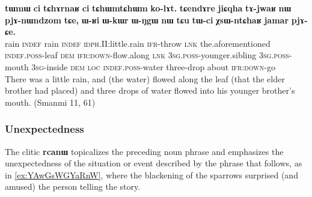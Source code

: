 \documentclass[oldfontcommands,oneside,a4paper,11pt]{article}
\newcommand{\ipa}[1]{\mbox{\phon\textbf{#1}}} %
\begin{document}
\begin{exe}
\ex \label{ex:jiCqha}
 \gll \ipa{tɯmɯ} 	\ipa{ci} 	\ipa{tɕhɤrnaʁ} 	\ipa{ci} 	\ipa{tɕhɯmtɕhɯm} 	\ipa{ko-lɤt.} 	\ipa{tɕendɤre} 	\ipa{jiɕqha} 	\ipa{tɤ-jwaʁ} 	\ipa{nɯ} 	\ipa{pjɤ-nɯndzom} 	\ipa{tɕe,} 	\ipa{ɯ-ʁi} 	\ipa{ɯ-kɯr} 	\ipa{ɯ-ŋgɯ} 	\ipa{nɯ} 	\ipa{tɕu} 	\ipa{tɯ-ci} 	\ipa{χsɯ-ntɕhaʁ} 	\ipa{jamar} 	\ipa{pjɤ-ɕe.} \\
 rain \textsc{indef}  rain \textsc{indef} \textsc{idph}.II:little.rain \textsc{ifr}-throw \textsc{lnk} the.aforementioned \textsc{indef.poss}-leaf \textsc{dem} \textsc{ifr:down}-flow.along \textsc{lnk} \textsc{3sg.poss}-younger.sibling  \textsc{3sg.poss}-mouth \textsc{3sg}-inside \textsc{dem} \textsc{loc} \textsc{indef.poss}-water three-drop about \textsc{ifr:down}-go \\
 \glt There was a little rain, and (the water) flowed along the leaf (that the elder brother had placed) and three drops of water flowed into his younger brother's mouth. (Smanmi 11, 61)
\end{exe}

 \subsubsection{Unexpectedness}
The clitic \ipa{rcanɯ} topicalizes the preceding noun phrase and emphasizes the unexpectedness of the situation or event described by the phrase that follows, as in \ref{ex:YAwGsWGYaRnW}, where the blackening of the sparrows surprised (and amused) the person telling the story.

\end{document}
